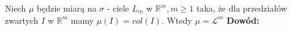 \begin{lem}
	Niech $\mu$ będzie miarą na $\sigma$ - ciele $L_m$ w $\mathbb{R}^m, m \geq 1$ taka, że dla przedziałów zwartych $I$ w $\mathbb{R}^m$ mamy $\mu(I) = vol(I)$. Wtedy $\mu = \mathcal{L}^m$
	\newline
	\textbf{Dowód:} \citep[3.45]{Tworzewski}
\end{lem}